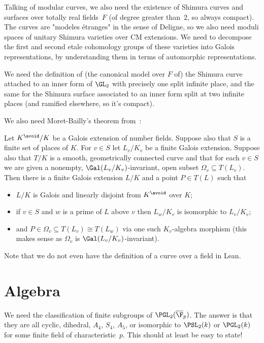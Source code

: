 Talking of modular curves, we also need the existence of Shimura curves and surfaces over totally real fields~$F$ (of degree greater than~2, so always compact). The curves are "modeles \'etranges" in the sense of Deligne, so we also need moduli spaces of unitary Shimura varieties over CM extensions. We need to decompose the first and second etale cohomology groups of these varieties into Galois representations, by understanding them
in terms of automorphic representations.

\begin{definition}\label{Shimura_varieties}\notready We need the definition of (the canonical model over $F$ of) the Shimura curve attached to an inner form of $\GL_2$ with precisely one split infinite place, and the same for the Shimura surface associated to an inner form split at two infinite places (and ramified elsewhere, so it's compact).
\end{definition}

We also need Moret-Bailly's theorem from~\cite{moret-bailly}:

\begin{theorem}\label{moret-bailly}\notready Let $K^{\avoid}/K$ be a Galois extension of number fields. Suppose also
that $S$ is a finite set of places of $K$. For $v\in S$ let $L_v/K_v$ be a finite Galois extension.
Suppose also that $T /K$ is a smooth, geometrically connected curve and that for each
$v\in S$ we are given a nonempty, $\Gal(L_v/K_v)$-invariant, open subset $\Omega_v\subseteq T(L_v)$.
Then there is a finite Galois extension $L/K$ and a point $P \in T(L)$ such that
\begin{itemize}
\item $L/K$ is Galois and linearly disjoint from $K^{\avoid}$ over $K$;
\item if $v\in S$ and $w$ is a prime of $L$ above $v$ then $L_w /K_v$ is isomorphic to $L_v/K_v$;
\item and $P \in\Omega_v\subseteq T(L_v) \cong T(L_w)$ via one such $K_v$-algebra morphism
(this makes sense as $\Omega_v$ is $\Gal(L_v/K_v)$-invariant).
\end{itemize}
\end{theorem}

Note that we do not even have the definition of a curve over a field in Lean.

\section{Algebra}

We need the classification of finite subgroups of $\PGL_2(\overline{\F}_p)$. The answer is that they are all cyclic, dihedral, $A_4$, $S_4$, $A_5$, or isomorphic to $\PSL_2(k)$ or $\PGL_2(k)$ for some finite field of characteristic~$p$. This should at least be easy to state!
